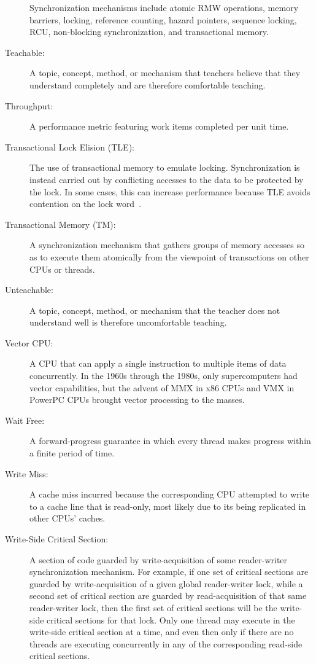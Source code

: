 \begin{description}
	Synchronization mechanisms include atomic RMW operations, memory
	barriers, locking, reference counting, hazard pointers, sequence
	locking, RCU, non-blocking synchronization, and transactional
	memory.
\item[Teachable:]
	A topic, concept, method, or mechanism that teachers believe that
	they understand completely and are therefore comfortable teaching.
\item[Throughput:]
	A performance metric featuring work items completed per unit time.
\item[Transactional Lock Elision (TLE):]
	The use of transactional memory to emulate locking.
	Synchronization is instead carried out by conflicting accesses
	to the data to be protected by the lock.
	In some cases, this can increase performance because TLE
	avoids contention on the lock
	word~\cite{MartinPohlack2011HTM2TLE,Kleen:2014:SEL:2566590.2576793,PascalFelber2016rwlockElision,SeongJaePark2020HTMRCUlock}.
\item[Transactional Memory (TM):]
	A synchronization mechanism that gathers groups of memory
	accesses so as to execute them atomically from the viewpoint
	of transactions on other CPUs or threads.
\item[Unteachable:]
	A topic, concept, method, or mechanism that the teacher does
	not understand well is therefore uncomfortable teaching.
\item[Vector CPU:]
	A CPU that can apply a single instruction to multiple items of
	data concurrently.
	In the 1960s through the 1980s, only supercomputers had vector
	capabilities, but the advent of MMX in x86 CPUs and VMX in
	PowerPC CPUs brought vector processing to the masses.
\item[Wait Free:]
	A forward-progress guarantee in which every thread makes
	progress within a finite period of time.
\item[Write Miss:]
	A cache miss incurred because the corresponding CPU attempted
	to write to a cache line that is read-only, most likely due
	to its being replicated in other CPUs' caches.
\item[Write-Side Critical Section:]
	A section of code guarded by write-acquisition of
	some reader-writer synchronization mechanism.
	For example, if one set of critical sections are guarded by
	write-acquisition of
	a given global reader-writer lock, while a second set of critical
	section are guarded by read-acquisition of that same reader-writer
	lock, then the first set of critical sections will be the
	write-side critical sections for that lock.
	Only one thread may execute in the write-side critical section
	at a time, and even then only if there are no threads are
	executing concurrently in any of the corresponding read-side
	critical sections.
\end{description}
